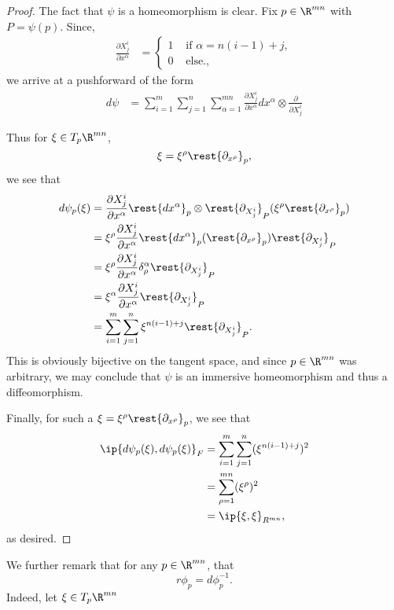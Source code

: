 \begin{proof}
	The fact that $\psi$ is a homeomorphism is clear. Fix $p\in\R^{mn}$ with $P=\psi(p)$.  Since,
	\begin{align*}
		\frac{\partial X^i_j}{\partial x^\alpha}&=\begin{cases}
			1&\text{ if }\alpha=n(i-1)+j,\\
			0&\text{ else.,}
		\end{cases}
	\end{align*}
	we arrive at a pushforward of the form
	\begin{align*}
		d\psi&=\sum_{i=1}^m\sum_{j=1}^n\sum_{\alpha=1}^{mn}\frac{\partial X^i_j}{\partial x^\alpha}dx^\alpha\otimes\frac{\partial}{\partial X^i_j}
	\end{align*}

	Thus for $\xi\in T_p\R^{mn}$,
	$$\xi=\xi^\rho\rest{\partial_{x^\rho}}_p,$$
	we see that
	\begin{align*}
		d\psi_p(\xi)&=\frac{\partial X^i_j}{\partial x^\alpha}\rest{dx^\alpha}_p\otimes\rest{\partial_{X^i_j}}_P(\xi^\rho\rest{\partial_{x^\rho}}_p)\\
		&=\xi^\rho\frac{\partial X^i_j}{\partial x^\alpha}\rest{dx^\alpha}_p(\rest{\partial_{x^\rho}}_p)\rest{\partial_{X^i_j}}_P\\
		&=\xi^\rho\frac{\partial X^i_j}{\partial x^\alpha}\delta^\alpha_\rho\rest{\partial_{X^i_j}}_P\\
		&=\xi^\alpha\frac{\partial X^i_j}{\partial x^\alpha}\rest{\partial_{X^i_j}}_P\\
		&=\sum_{i=1}^m\sum_{j=1}^n\xi^{n(i-1)+j}\rest{\partial_{X^i_j}}_P.
	\end{align*}
	This is obviously bijective on the tangent space, and since $p\in\R^{mn}$ was arbitrary, we may conclude that $\psi$ is an immersive homeomorphism and thus a diffeomorphism.
	
	Finally, for such a $\xi=\xi^\rho\rest{\partial_{x^\rho}}_p$, we see that
	\begin{align*}
		\ip{d\psi_p(\xi),d\psi_p(\xi)}_F&=\sum_{i=1}^m\sum_{j=1}^n(\xi^{n(i-1)+j})^2\\
		&=\sum_{\rho=1}^{mn}(\xi^\rho)^2\\
		&=\ip{\xi,\xi}_{R^{mn}},
	\end{align*}
	as desired.
\end{proof}

We further remark that for any $p\in\R^{mn}$, that
$$r\phi_p=d\phi^{-1}_p.$$
Indeed, let $\xi\in T_p\R^{mn}$


